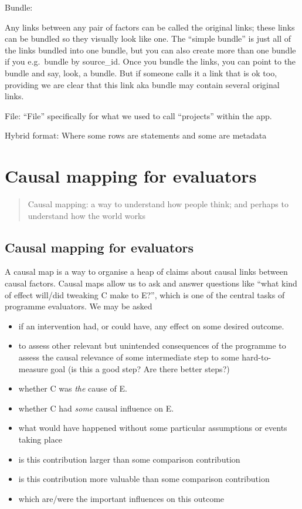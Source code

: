 \documentclass[
]{book}
\begin{document}
Bundle:

Any links between any pair of factors can be called the original links; these links can be bundled so they visually look like one. The ``simple bundle'' is just all of the links bundled into one bundle, but you can also create more than one bundle if you e.g.~bundle by source\_id. Once you bundle the links, you can point to the bundle and say, look, a bundle. But if someone calls it a link that is ok too, providing we are clear that this link aka bundle may contain several original links.

File: ``File'' specifically for what we used to call ``projects'' within the app.

Hybrid format: Where some rows are statements and some are metadata

\hypertarget{mapping}{%
\chapter{Causal mapping for evaluators}\label{mapping}}

\begin{quote}
Causal mapping: a way to understand how people think; and perhaps to understand how the world works
\end{quote}

\hypertarget{causal-mapping-for-evaluators}{%
\section{Causal mapping for evaluators}\label{causal-mapping-for-evaluators}}

A causal map is a way to organise a heap of claims about causal links between causal factors. Causal maps allow us to ask and answer questions like ``what kind of effect will/did tweaking C make to E?'', which is one of the central tasks of programme evaluators. We may be asked

\begin{itemize}
\item
  if an intervention had, or could have, any effect on some desired outcome.
\item
  to assess other relevant but unintended consequences of the programme to assess the causal relevance of some intermediate step to some hard-to-measure goal (is this a good step? Are there better steps?)
\item
  whether C was \emph{the} cause of E.
\item
  whether C had \emph{some} causal influence on E.
\item
  what would have happened without some particular assumptions or events taking place
\item
  is this contribution larger than some comparison contribution
\item
  is this contribution more valuable than some comparison contribution
\item
  which are/were the important influences on this outcome
\end{itemize}
\end{document}
